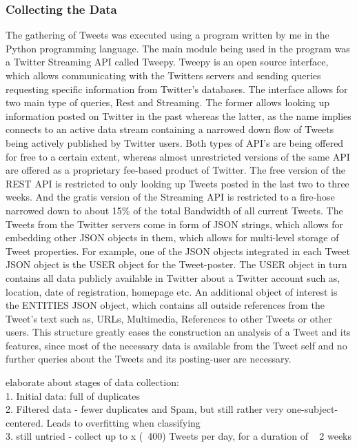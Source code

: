 		\subsubsection*{Collecting the Data}
		\label{sec:collect_data}
		The gathering of Tweets was executed using a program written by me in the Python programming language. The main module being used in the program was a Twitter Streaming API called Tweepy. Tweepy is an open source interface, which allows communicating with the Twitters servers and sending queries requesting specific information from Twitter's databases. The interface allows for two main type of queries, Rest and Streaming. The former allows looking up information posted on Twitter in the past whereas the latter, as the name implies connects to an active data stream containing a narrowed down flow of Tweets being actively published by Twitter users. Both types of API's are being offered for free to a certain extent, whereas almost unrestricted versions of the same API are offered as a proprietary fee-based product of Twitter. The free version of the REST API is restricted to only looking up Tweets posted in the last two to three weeks. And the gratis version of the Streaming API is restricted to a fire-hose narrowed down to about 15\% of the total Bandwidth of all current Tweets.
		The Tweets from the Twitter servers come in form of JSON strings, which allows for embedding other JSON objects in them, which allows for multi-level storage of Tweet properties. For example, one of the JSON objects integrated in each Tweet JSON object is the USER object for the Tweet-poster. The USER object in turn contains all data publicly available in Twitter about a Twitter account such as, location, date of registration, homepage etc. An additional object of interest is the ENTITIES JSON object, which contains all outside references from the Tweet's text such as, URLs, Multimedia, References to other Tweets or other users. 
		This structure greatly eases the construction an analysis of a Tweet and its features, since most of the necessary data is available from the Tweet self and no further queries about the Tweets and its posting-user are necessary.
		\par
		{\LARGE \color{red}
			elaborate about stages of data collection:
		} \\ 
		{\color{red}
			1. Initial data: full of duplicates\\
			2. Filtered data - fewer duplicates and Spam, but still rather very one-subject-centered. Leads to overfitting when classifying \\
			3. still untried - collect up to x (~400) Tweets per day, for a duration of ~ 2 weeks
		}
		
